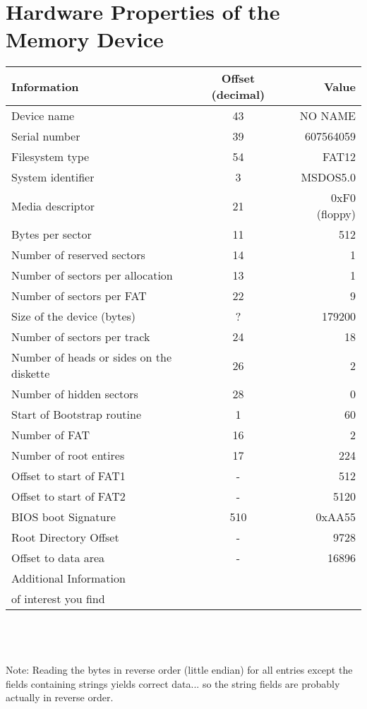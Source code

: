 \documentclass{article}
\begin{document}
\section{Hardware Properties of the Memory Device}
\begin{tabular}{l c r}
    \hline
    \textbf{Information} & \textbf{Offset (decimal)} & \textbf{Value}\\
    \hline
    Device name & 43 & NO NAME    \\
    Serial number & 39 & 607564059\\
    Filesystem type & 54 & FAT12   \\
    System identifier & 3 & MSDOS5.0\\
    Media descriptor & 21 & 0xF0 (floppy)\\
    Bytes per sector & 11 & 512\\
    Number of reserved sectors & 14 & 1\\
    Number of sectors per allocation & 13 & 1\\
    Number of sectors per FAT & 22 & 9\\
    Size of the device (bytes) & ? & 179200\\
    Number of sectors per track & 24 & 18\\
    Number of heads or sides on the diskette & 26 & 2\\
    Number of hidden sectors & 28 & 0\\
    Start of Bootstrap routine & 1 &60\\
    Number of FAT & 16 & 2\\
    Number of root entires & 17 & 224\\ 
    Offset to start of FAT1 & - & 512\\
    Offset to start of FAT2 & - & 5120\\
    BIOS boot Signature & 510 & 0xAA55\\
    Root Directory Offset & - & 9728\\
    Offset to data area & - & 16896\\
    Additional Information & &\\
    of interest you find & &\\
    \hline
\end{tabular}\\
\\
\\
Note: Reading the bytes in reverse order (little endian) for all entries except the fields containing strings yields correct data... so the string fields are probably actually in reverse order.
\end{document}
